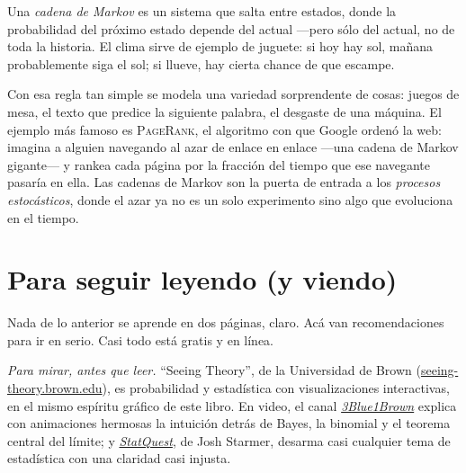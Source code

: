 Una \emph{cadena de Markov} es un sistema que salta entre estados, donde la probabilidad del próximo estado depende del actual —pero sólo del actual, no de toda la historia. El clima sirve de ejemplo de juguete: si hoy hay sol, mañana probablemente siga el sol; si llueve, hay cierta chance de que escampe.

\begin{center}
\end{center}

Con esa regla tan simple se modela una variedad sorprendente de cosas: juegos de mesa, el texto que predice la siguiente palabra, el desgaste de una máquina. El ejemplo más famoso es \textsc{PageRank}, el algoritmo con que Google ordenó la web: imagina a alguien navegando al azar de enlace en enlace —una cadena de Markov gigante— y rankea cada página por la fracción del tiempo que ese navegante pasaría en ella. Las cadenas de Markov son la puerta de entrada a los \emph{procesos estocásticos}, donde el azar ya no es un solo experimento sino algo que evoluciona en el tiempo.

\section{Para seguir leyendo (y viendo)}

Nada de lo anterior se aprende en dos páginas, claro. Acá van recomendaciones para ir en serio. Casi todo está gratis y en línea.

\emph{Para mirar, antes que leer.} \enquote{Seeing Theory}, de la Universidad de Brown (\href{https://seeing-theory.brown.edu/}{{seeing-theory.brown.edu}}), es probabilidad y estadística con visualizaciones interactivas, en el mismo espíritu gráfico de este libro. En video, el canal \href{https://www.youtube.com/@3blue1brown}{\emph{3Blue1Brown}} explica con animaciones hermosas la intuición detrás de Bayes, la binomial y el teorema central del límite; y \href{https://www.youtube.com/@statquest}{\emph{StatQuest}}, de Josh Starmer, desarma casi cualquier tema de estadística con una claridad casi injusta.

